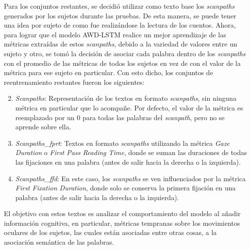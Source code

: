 Para los conjuntos restantes, se decidió utilizar como texto base los \textit{scanpaths} generados por los sujetos durante las pruebas. De esta manera, se puede tener una idea por sujeto de como fue realizándose la lectura de los cuentos. Ahora, para lograr que el modelo AWD-LSTM realice un mejor aprendizaje de las métricas extraídas de estos \textit{scanpaths}, debido a la variedad de valores entre un sujeto y otro, se tomó la decisión de asociar cada palabra dentro de los \textit{scanpaths} con el promedio de las métricas de todos los sujetos en vez de con el valor de la métrica para ese sujeto en particular. Con esto dicho, los conjuntos de reentrenamiento restantes fueron los siguientes:

\begin{enumerate}
    \setcounter{enumi}{1}
    \item \textit{Scanpaths}: Representación de los textos en formato \textit{scanpaths}, sin ninguna métrica en particular que lo acompañe. Por defecto, el valor de la métrica es reemplazado por un 0 para todas las palabras del \textit{scanpath}, pero no se aprende sobre ella.
    \item \textit{Scanpaths\_fprt}: Textos en formato \textit{scanpaths} utilizando la métrica \textit{Gaze Duration} o \textit{First Pass Reading Time}, donde se suman las duraciones de todas las fijaciones en una palabra (antes de salir hacia la derecha o la izquierda).
    \item \textit{Scanpaths\_ffd}: En este caso, los \textit{scanpaths} se ven influenciados por la métrica \textit{First Fixation Duration}, donde solo se conserva la primera fijación en una palabra (antes de salir hacia la derecha o la izquierda).
\end{enumerate}

El objetivo con estos textos es analizar el comportamiento del modelo al añadir información cognitiva, en particular, métricas tempranas sobre los movimientos oculares de los sujetos, las cuales están asociadas entre otras cosas, a la asociación semántica de las palabras.





